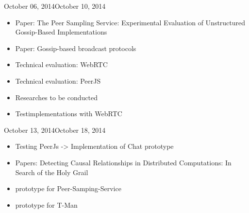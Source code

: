 \documentclass[11pt, english, screen]{report-rd-info}
\begin{document}
\begin{fichesuivi}{October 06, 2014}{October 10, 2014}

   \begin{travaileffectue}
      \begin{itemize}
          \item {Paper: The Peer Sampling Service: Experimental Evaluation of Unstructured Gossip-Based Implementations}
        \item {Paper: Gossip-based broadcast protocols}
        \item {Technical evaluation: WebRTC}
        \item {Technical evaluation: PeerJS}
      \end{itemize}
   \end{travaileffectue}

   \begin{travailnoneffectue}
   \end{travailnoneffectue}

   \begin{echange}
   \end{echange}

   \begin{planification}
      \begin{itemize}
         \item Researches to be conducted
        \item Testimplementations with WebRTC 
     \end{itemize}
   \end{planification}
\end{fichesuivi}

\begin{fichesuivi}{October 13, 2014}{October 18, 2014}

   \begin{travaileffectue}
      \begin{itemize}
   \item {Testing PeerJs -> Implementation of Chat prototype}
   \item {Papers: Detecting Causal Relationships in Distributed Computations: In Search of the Holy Grail}
     \end{itemize}
   \end{travaileffectue}

   \begin{travailnoneffectue}
   \end{travailnoneffectue}

   \begin{echange}
   \end{echange}

   \begin{planification}
      \begin{itemize}
   \item {prototype for Peer-Samping-Service}
   \item {prototype for T-Man}
     \end{itemize}
   \end{planification}
\end{fichesuivi}
\end{document}
